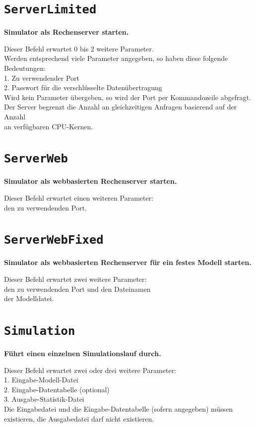 \section{\texttt{ServerLimited}}

\textbf{Simulator als Rechenserver starten.}

Dieser Befehl erwartet 0 bis 2 weitere Parameter.\\
Werden entsprechend viele Parameter angegeben, so haben diese folgende Bedeutungen:\\
1. Zu verwendender Port\\
2. Passwort für die verschlüsselte Datenübertragung\\
Wird kein Parameter übergeben, so wird der Port per Kommandozeile abgefragt.\\
Der Server begrenzt die Anzahl an gleichzeitigen Anfragen basierend auf der Anzahl\\
an verfügbaren CPU-Kernen.

\section{\texttt{ServerWeb}}

\textbf{Simulator als webbasierten Rechenserver starten.}

Dieser Befehl erwartet einen weiteren Parameter:\\
den zu verwendenden Port.

\section{\texttt{ServerWebFixed}}

\textbf{Simulator als webbasierten Rechenserver für ein festes Modell starten.}

Dieser Befehl erwartet zwei weitere Parameter:\\
den zu verwendenden Port und den Dateinamen\\
der Modelldatei.

\section{\texttt{Simulation}}

\textbf{Führt einen einzelnen Simulationslauf durch.}

Dieser Befehl erwartet zwei oder drei weitere Parameter:\\
1. Eingabe-Modell-Datei\\
2. Eingabe-Datentabelle (optional)\\
3. Ausgabe-Statistik-Datei\\
Die Eingabedatei und die Eingabe-Datentabelle (sofern angegeben) müssen existieren, die Ausgabedatei darf nicht existieren.

